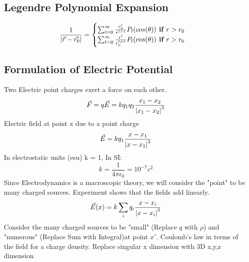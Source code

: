 \documentclass[12pt]{article}
\begin{document}
    \subsection{Legendre Polynomial Expansion} \label{Appendix1}
        \begin{equation} \label{eq: a1-1}
            \frac{1}{\abs{\vec{r}-\vec{r_0}}} = 
            \begin{cases}
                \sum_{l=0}^\infty \frac{r_0^l}{r^{l+1}} P_l(cos(\theta)) \textbf{  if $r>r_0$}
                \\
                \sum_{l=0}^\infty \frac{r^l}{r_0^{l+1}} P_l(cos(\theta)) \textbf{  if $r>r_0$}
            \end{cases}
        \end{equation}
        
    \subsection{Formulation of Electric Potential} \label{Appendix2}
        Two Electric point charges exert a force on each other.
        \begin{equation} \label{eq: a2-1}
            \vec{F} = q \vec{E} = k q_1 q_2 \frac{x_1-x_2}{\abs{x_1-x_2}^3}
        \end{equation}
        \newline Electric field at point x due to a point charge
        \begin{equation} \label{eq: a2-2}
            \vec{E} = k q_1 \frac{x-x_1}{\abs{x-x_1}^3}
        \end{equation}
        \newline In electrostatic units (esu) k = 1, In SI:
        \begin{equation} \label{eq: a2-3}
            k = \frac{1}{4 \pi \epsilon_0} = 10^{-7} c^2
        \end{equation}
        \newline Since Electrodynamics is a macroscopic theory, we will consider the "point" to be many charged sources. Experiment shows that the fields add linearly.
        \begin{equation} \label{eq: a2-4}
            \vec{E}(x)= k \sum_i q_i \frac{x-x_i}{\abs{x - x_i}^3}
        \end{equation}
        \newline Consider the many charged sources to be "small" (Replace $q$ with $\rho$) and "numerous" (Replace Sum with Integral)at point $x'$. Coulomb's law in terms of the field for a charge density. Replace singular x dimension with 3D x,y,z dimension 
\end{document}
